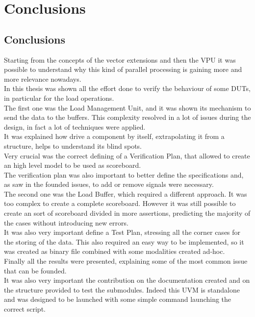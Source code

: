 \chapter{Conclusions}
\section{Conclusions}
Starting from the concepts of the vector extensions and then the VPU it was possible to understand why this kind of parallel processing is gaining more and more relevance nowadays.\\

In this thesis was shown all the effort done to verify the behaviour of some DUTs, in particular for the load operations.\\

The first one was the Load Management Unit, and it was shown its mechanism to send the data to the buffers. This complexity resolved in a lot of issues during the design, in fact a lot of techniques were applied.\\
It was explained how drive a component by itself, extrapolating it from a structure, helps to understand its blind spots.\\
Very crucial was the correct defining of a Verification Plan, that allowed to create an high level model to be used as scoreboard.\\
The verification plan was also important to better define the specifications and, as saw in the founded issues, to add or remove signals were necessary.\\

The second one was the Load Buffer, which required a different approach. It was too complex to create a complete scoreboard. However it was still possible to create an sort of scoreboard divided in more assertions, predicting the majority of the cases without introducing new errors.\\
It was also very important define a Test Plan, stressing all the corner cases for the storing of the data. This also required an easy way to be implemented, so it was created as binary file combined with some modalities created ad-hoc.\\

Finally all the results were presented, explaining some of the most common issue that can be founded.\\
It was also very important the contribution on the documentation created and on the structure provided to test the submodules. Indeed this UVM is standalone and was designed to be launched with some simple command launching the correct script.\\

